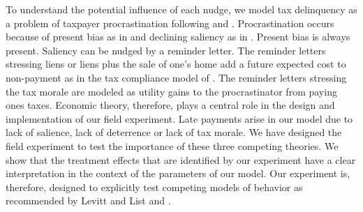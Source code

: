 \documentclass[12pt]{article}
\begin{document}
To understand the potential influence of each nudge, we model tax
delinquency as a problem of taxpayer procrastination following
 and .  Procrastination occurs 
because of present bias as in  and declining saliency as in
.  Present bias is always present.  Saliency can be
nudged by a reminder letter.  The reminder letters stressing liens or
liens plus the sale of one's home add a future expected cost to
non-payment as in the tax compliance model of
.  The reminder letters stressing the tax
morale are modeled as utility gains to the procrastinator from paying
ones taxes.  Economic theory, therefore, plays a central role in the design and implementation
of our field experiment. Late payments arise in our model 
due to lack of salience, lack of deterrence or lack of tax morale.  
We have designed the field experiment to test the importance of these 
three competing theories. We show that the treatment effects that are identified
by our experiment have a clear interpretation in the context of the
parameters of our model.  Our experiment is, therefore, designed to explicitly
test competing models of behavior as recommended by Levitt and List
\citeyear{levitt2007laboratory} and .
\end{document}
